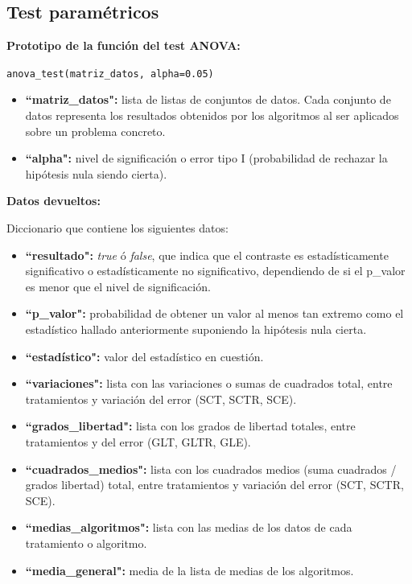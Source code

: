 \subsection{Test paramétricos}

\noindent
\textbf{Prototipo de la función del test ANOVA:}

\texttt{anova\_test(matriz\_datos, alpha=0.05)}

\begin{itemize}
\item \textbf{``matriz\_datos":} lista de listas de conjuntos de datos. Cada conjunto de datos representa los resultados obtenidos por los algoritmos al ser aplicados sobre un problema concreto.
\item \textbf{``alpha":} nivel de significación o error tipo I (probabilidad de rechazar la hipótesis nula siendo cierta).
\end{itemize}

\noindent
\textbf{Datos devueltos:}

Diccionario que contiene los siguientes datos:

\begin{itemize}
\item \textbf{``resultado":} \textit{true} ó \textit{false}, que indica que el contraste es estadísticamente significativo o estadísticamente no significativo, dependiendo de si el p\_valor es menor que el nivel de significación.
\item \textbf{``p\_valor":} probabilidad de obtener un valor al menos tan extremo como el estadístico hallado anteriormente suponiendo la hipótesis nula cierta.
\item \textbf{``estadístico":} valor del estadístico en cuestión.
\item \textbf{``variaciones":} lista con las variaciones o sumas de cuadrados total, entre tratamientos y variación del error (SCT, SCTR, SCE).
\item \textbf{``grados\_libertad":} lista con los grados de libertad totales, entre tratamientos y del error (GLT, GLTR, GLE).
\item \textbf{``cuadrados\_medios":} lista con los cuadrados medios (suma cuadrados / grados libertad) total, entre tratamientos y variación del error (SCT, SCTR, SCE).
\item \textbf{``medias\_algoritmos":} lista con las medias de los datos de cada tratamiento o algoritmo.
\item \textbf{``media\_general":} media de la lista de medias de los algoritmos.
\end{itemize}

